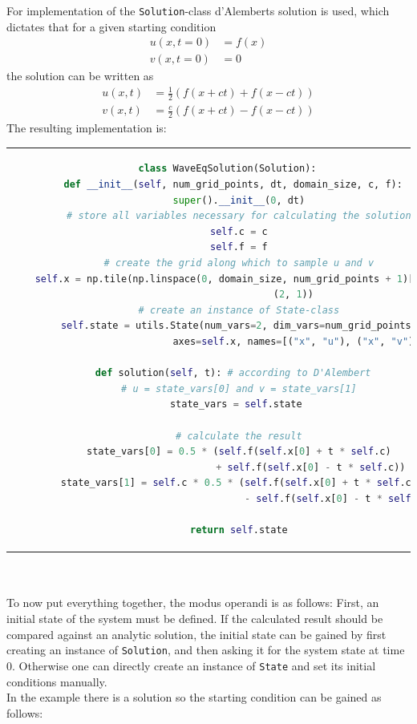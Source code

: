 For implementation of the \texttt{Solution}-class d'Alemberts solution is used, which dictates that for a given starting condition
\begin{align*}
u(x,t=0) &= f(x)\\
v(x,t=0) &= 0
\end{align*}
the solution can be written as
\begin{align*}
u(x,t) &= \frac{1}{2}(f(x+ct)+f(x-ct))\\
v(x,t) &= \frac{c}{2}(f(x+ct)-f(x-ct))
\end{align*}
The resulting implementation is:\\
\begin{tabular}{c}
\begin{lstlisting}[language=Python]
class WaveEqSolution(Solution):
  def __init__(self, num_grid_points, dt, domain_size, c, f):
    super().__init__(0, dt)
    # store all variables necessary for calculating the solution
    self.c = c
    self.f = f
    # create the grid along which to sample u and v
    self.x = np.tile(np.linspace(0, domain_size, num_grid_points + 1)[:-1],
                       (2, 1))
    # create an instance of State-class
    self.state = utils.State(num_vars=2, dim_vars=num_grid_points,
                         axes=self.x, names=[("x", "u"), ("x", "v")])

  def solution(self, t): # according to D'Alembert
    # u = state_vars[0] and v = state_vars[1]
    state_vars = self.state 
        
    # calculate the result
    state_vars[0] = 0.5 * (self.f(self.x[0] + t * self.c)
                             + self.f(self.x[0] - t * self.c))
    state_vars[1] = self.c * 0.5 * (self.f(self.x[0] + t * self.c)
                                       - self.f(self.x[0] - t * self.c))

    return self.state
\end{lstlisting}
\end{tabular}
\\\\
To now put everything together, the modus operandi is as follows:
First, an initial state of the system must be defined.
If the calculated result should be compared against an analytic solution, the initial state can be gained by first creating an instance of \texttt{Solution}, and then asking it for the system state at time $0$.
Otherwise one can directly create an instance of \texttt{State} and set its initial conditions manually.
\\
In the example there is a solution so the starting condition can be gained as follows:\\
